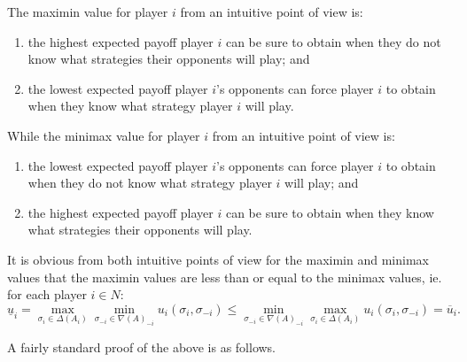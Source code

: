 	The maximin value for player $i$ from an intuitive point of view is:
	\begin{enumerate}
		\item the highest expected payoff player $i$ can be sure to obtain when they do not know what strategies their opponents will play; and
		\item the lowest expected payoff player $i$'s opponents can force player $i$ to obtain when they know what strategy player $i$ will play.
	\end{enumerate}
	
	While the minimax value for player $i$ from an intuitive point of view is:
	\begin{enumerate}
		\item the lowest expected payoff player $i$'s opponents can force player $i$ to obtain when they do not know what strategy player $i$ will play; and
		\item the highest expected payoff player $i$ can be sure to obtain when they know what strategies their opponents will play.
	\end{enumerate} 
	
	It is obvious from both intuitive points of view for the maximin and minimax values that the maximin values are less than or equal to the minimax values, ie. for each player $i \in N$:
	\[\underline{u}_i = \max_{\sigma_i \in \Delta(A_i)}\min_{\sigma_{-i} \in {\nabla(A)}_{-i}} u_i(\sigma_i, \sigma_{-i}) \leq \min_{\sigma_{-i} \in {\nabla(A)}_{-i}}\max_{\sigma_i \in \Delta(A_i)} u_i(\sigma_i, \sigma_{-i}) = \overline{u}_i.\]
	
	A fairly standard proof of the above is as follows.
	
